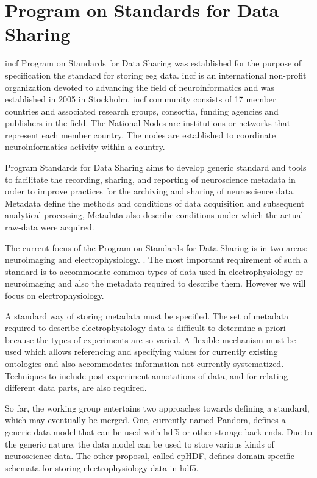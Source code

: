 \section{Program on Standards for Data Sharing}
\label{incf}
\gls{incf} Program on Standards for Data Sharing was established for the purpose of specification the standard for storing \gls{eeg} data. \gls{incf} is an international non-profit organization devoted to advancing the field of neuroinformatics and was established in 2005 in Stockholm. \gls{incf} community consists of 17 member countries and associated research groups, consortia, funding agencies and publishers in the field. The National Nodes are institutions or networks that represent each member country. The nodes are established to coordinate neuroinformatics activity within a country.  \cite{incfweb}

Program Standards for Data Sharing aims to develop generic standard and tools to facilitate the recording, sharing, and reporting of neuroscience metadata in order to improve practices for the archiving and sharing of neuroscience data. Metadata define the methods and conditions of data acquisition and subsequent analytical processing, Metadata also describe conditions under which the actual raw-data were acquired.

The current focus of the Program on Standards for Data Sharing is in two areas: neuroimaging and electrophysiology. \cite{incf_mission}. The most important requirement of such a standard is to accommodate common types of data used in electrophysiology or neuroimaging and also the metadata required to describe them. However we will focus on electrophysiology.

A standard way of storing metadata must be specified. The set of metadata required to describe electrophysiology data is difficult to determine a priori because the types of experiments are so varied.  A flexible mechanism must be used which allows referencing and specifying values for currently existing ontologies and also accommodates information not currently systematized. Techniques to include post-experiment annotations of data, and for relating different data parts, are also required. \cite{hdf5standard}

So far, the working group entertains two approaches towards defining a standard, which may eventually be merged. One, currently named Pandora, defines a generic data model that can be used with \gls{hdf5} or other storage back-ends. Due to the generic nature, the data model can be used to store various kinds of neuroscience data. The other proposal, called epHDF, defines domain specific schemata for storing electrophysiology data in \gls{hdf5}. \cite{hdf5standard}

